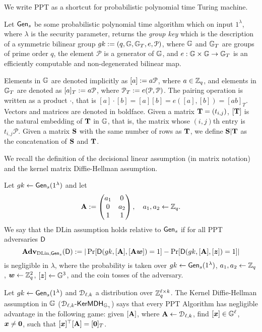 We write PPT as a shortcut for probabilistic polynomial time Turing machine.

Let $\mathsf{Gen}_s$ be some probabilistic polynomial time algorithm which on input $1^{\lambda}$, where $\lambda$ is the security parameter, returns the \emph{group key} which is the description of a symmetric bilinear group $gk:=(q,\mathbb{G},\mathbb{G}_T,e,\mathcal{P})$, where $\mathbb{G}$
and $\mathbb{G}_T$ are groups of prime order $q$, the element $\mathcal{P}$ is a generator of 
$\mathbb{G}$, and $e:\mathbb{G}\times\mathbb{G}\to\mathbb{G}_T$ is an efficiently computable and non-degenerated bilinear map.

Elements in $\mathbb{G}$ are denoted implicitly as $[a]:=a \mathcal{P}$, where $a\in\mathbb{Z}_q$, and elements in $\mathbb{G}_T$ are denoted as $[a]_T:=a\mathcal{P}$, where $\mathcal{P}_T:=e(\mathcal{P},\mathcal{P})$. 
The pairing operation is written as a product $\cdot$, that is $[a] \cdot [b]=[a] [b]=e([a],[b])=[ab]_T$. Vectors and matrices are denoted in boldface. Given a matrix $\mathbf{{T}}=(t_{i,j})$, $[\mathbf{{T}}]$ is
the natural embedding of $\mathbf{{T}}$ in $\mathbb{G}$, that is, the matrix whose $(i,j)$th entry is $t_{i,j}\mathcal{P}$. Given a matrix $\mathbf{{S}}$ with the same number of rows as $\mathbf{{T}}$, we define $\mathbf{{S}}|\mathbf{{T}}$ as the concatenation of $\mathbf{{S}}$ and $\mathbf{{T}}$.

We recall the definition of the decisional linear assumption (in matrix notation) and the kernel matrix Diffie-Hellman assumption.

\begin{definition}\label{def:dlin}
 Let  ${gk} 
\gets \mathsf{Gen}_s(1^\lambda)$ and let
$$
\mathbf{{A}} :=
\begin{pmatrix} 
a_1 & 0     \\
0     & a_2 \\
1     &  1
\end{pmatrix},
\quad
a_1,a_2\gets\mathbb{Z}_q.
$$
We say that the DLin assumption holds relative to $\mathsf{Gen}_s$ if for all PPT adversaries $\mathsf{D}$
$$
\mathbf{Adv}_{\mathrm{DLin},\mathsf{Gen}_s}(\mathsf{D}) := |
	\Pr[
		\mathsf{D}(
			gk,
			[\mathbf{{A}}],
			[\mathbf{{A}}{\boldsymbol{w}}])=1]
	-\Pr[
		\mathsf{D}(
		gk,
		[\mathbf{{A}}],
		[{\boldsymbol{z}}])=1]|
$$
is negligible in $\lambda$, where the probability is taken over $gk\gets\mathsf{Gen}_s(1^\lambda)$, $a_1,a_2\gets\mathbb{Z}_q$, ${\boldsymbol{w}}\gets\mathbb{Z}_q^2$, $[{\boldsymbol{z}}]\gets\mathbb{G}^3$, and the coin tosses of the adversary. 
\end{definition}

\begin{definition} Let  ${gk} 
\gets\mathsf{Gen}_s(1^\lambda)$ and $\mathcal{D}_{\ell,k}$ a distribution over $\mathbb{Z}_q^{\ell\times k}$.
The Kernel Diffie-Hellman assumption in $\mathbb{G}$ ($\mathcal{D}_{\ell,k}\mbox{-}\mathsf{KerMDH}_{\mathbb{G}_\gamma}$) says that every PPT Algorithm has negligible advantage in the following  game: given $[\mathbf{{A}}]$, where $\mathbf{{A}} \gets \mathcal{D}_{\ell,k}$, find $[{\boldsymbol{x}}] \in \mathbb{G}^{\ell}$, ${\boldsymbol{x}} \neq {\boldsymbol{0}}$, such that 
$[{\boldsymbol{x}}]^{\top}[\mathbf{{A}}]=[{\boldsymbol{0}}]_T$. 
\end{definition}

